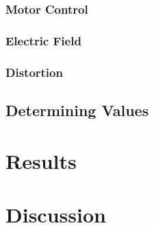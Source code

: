 \documentclass{physics_article_B}
\begin{document}
        \subsubsection{Motor Control}
    	\subsubsection{Electric Field}
    	\subsubsection{Distortion}
    
    \subsection{Determining Values}

    

    


\section{Results}

\section{Discussion}
\newpage



    

\end{document}
